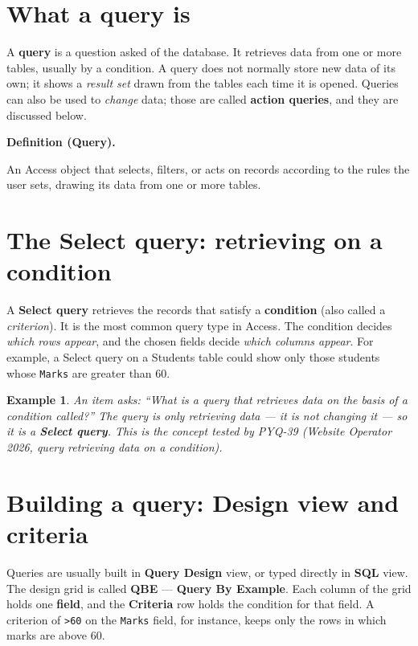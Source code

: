 \documentclass[11pt]{article}
\newtheorem{example}{Example}[section]
\newenvironment{definitionbox}[1]{%
  \par\noindent\textbf{Definition (#1).}\ \itshape
}{\par\vspace{0.3em}}
\begin{document}
\section{What a query is}
A \textbf{query} is a question asked of the database. It retrieves data from
one or more tables, usually by a condition. A query does not normally store
new data of its own; it shows a \emph{result set} drawn from the tables each
time it is opened. Queries can also be used to \emph{change} data; those are
called \textbf{action queries}, and they are discussed below.

\begin{definitionbox}{Query}
An Access object that selects, filters, or acts on records according to the
rules the user sets, drawing its data from one or more tables.
\end{definitionbox}

\section{The Select query: retrieving on a condition}
A \textbf{Select query} retrieves the records that satisfy a
\textbf{condition} (also called a \emph{criterion}). It is the most common
query type in Access. The condition decides \emph{which rows appear}, and
the chosen fields decide \emph{which columns appear}. For example, a Select
query on a Students table could show only those students whose
\texttt{Marks} are greater than 60.

\begin{example}
An item asks: ``What is a query that retrieves data on the basis of a
condition called?'' The query is only \emph{retrieving} data --- it is not
changing it --- so it is a \textbf{Select query}. This is the concept tested
by PYQ-39 (Website Operator 2026, query retrieving data on a condition).
\end{example}

\section{Building a query: Design view and criteria}
Queries are usually built in \textbf{Query Design} view, or typed directly in
\textbf{SQL} view. The design grid is called \textbf{QBE} ---
\textbf{Query By Example}. Each column of the grid holds one \textbf{field},
and the \textbf{Criteria} row holds the condition for that field. A criterion
of \texttt{>60} on the \texttt{Marks} field, for instance, keeps only the
rows in which marks are above 60.
\end{document}
